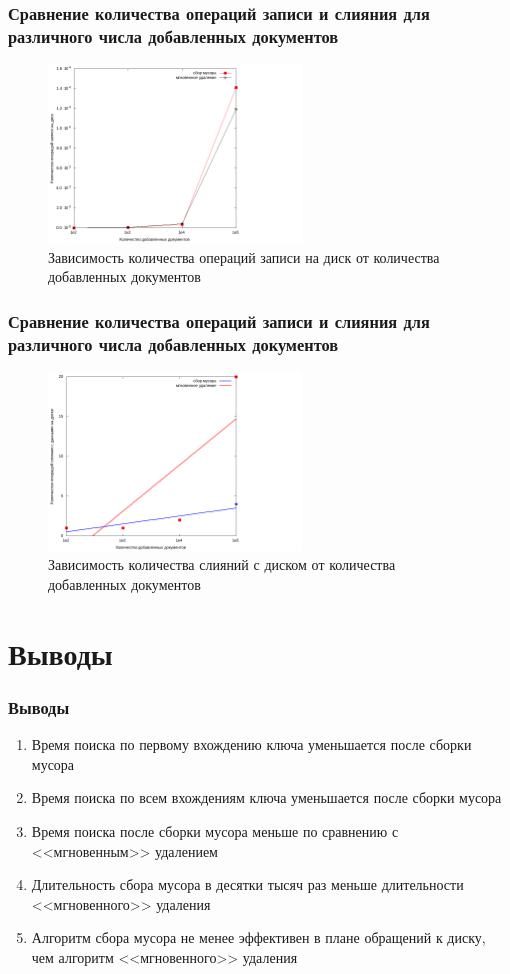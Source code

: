 \documentclass[aspectratio=169, pdf, 8pt, unicode]{beamer}
\begin{document}
\begin{frame}[fragile]
\frametitle{Сравнение количества операций записи и слияния для различного числа
добавленных документов}
\begin{figure}[H]
\centering
\hfil
\includegraphics[width=0.6\textwidth]{fig/writecalls.png}
\caption{Зависимость количества операций записи на диск от количества добавленных документов}
\end{figure}
\end{frame}

\begin{frame}[fragile]
\frametitle{Сравнение количества операций записи и слияния для различного числа
добавленных документов}
\begin{figure}[H]
\centering
\hfil
\includegraphics[width=0.6\textwidth]{fig/merges.png}
\caption{Зависимость количества слияний с диском от количества добавленных документов}
\end{figure}
\end{frame}

\section{Выводы}

\begin{frame}[fragile]
\frametitle{Выводы}
\begin{enumerate}
\item Время поиска по первому вхождению ключа уменьшается после сборки мусора
\item Время поиска по всем вхождениям ключа уменьшается после сборки мусора
\item Время поиска после сборки мусора меньше по сравнению с <<мгновенным>> удалением
\item Длительность сбора мусора в десятки тысяч раз меньше длительности <<мгновенного>> удаления
\item Алгоритм сбора мусора не менее эффективен в плане обращений к диску, чем алгоритм <<мгновенного>> удаления
\end{enumerate}
\end{frame}
\end{document}
